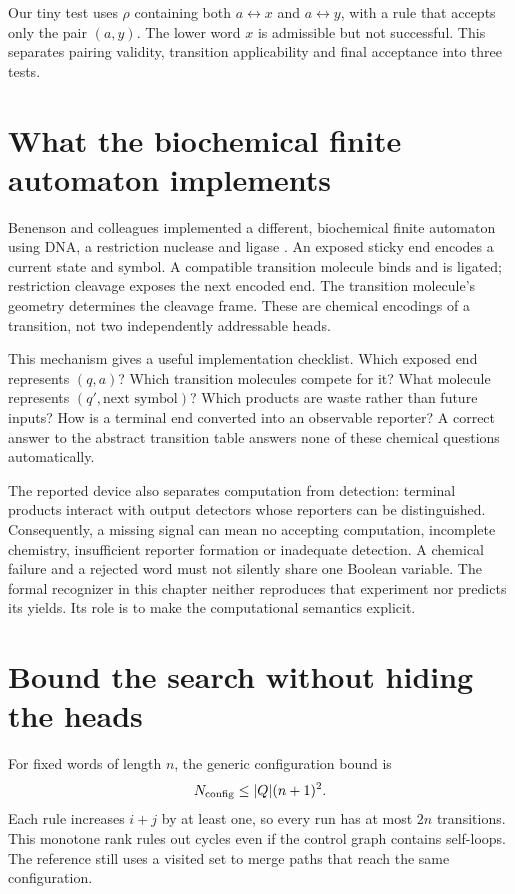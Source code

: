 Our tiny test uses $\rho$ containing both $a\leftrightarrow x$ and
$a\leftrightarrow y$, with a rule that accepts only the pair $(a,y)$.
The lower word $x$ is admissible but not successful. This separates pairing
validity, transition applicability and final acceptance into three tests.

\section{What the biochemical finite automaton implements}
Benenson and colleagues implemented a different, biochemical finite automaton
using DNA, a restriction nuclease and ligase \cite{benenson}. An exposed sticky
end encodes a current state and symbol. A compatible transition molecule binds
and is ligated; restriction cleavage exposes the next encoded end. The
transition molecule's geometry determines the cleavage frame. These are
chemical encodings of a transition, not two independently addressable heads.


This mechanism gives a useful implementation checklist. Which exposed end
represents $(q,a)$? Which transition molecules compete for it? What molecule
represents $(q',\text{next symbol})$? Which products are waste rather than
future inputs? How is a terminal end converted into an observable reporter?
A correct answer to the abstract transition table answers none of these
chemical questions automatically.

The reported device also separates computation from detection: terminal
products interact with output detectors whose reporters can be distinguished.
Consequently, a missing signal can mean no accepting computation, incomplete
chemistry, insufficient reporter formation or inadequate detection. A chemical
failure and a rejected word must not silently share one Boolean variable.
The formal recognizer in this chapter neither reproduces that experiment nor
predicts its yields. Its role is to make the computational semantics explicit.

\section{Bound the search without hiding the heads}
For fixed words of length $n$, the generic configuration bound is
\begin{equation}
 N_{\rm config}\leq |Q|(n+1)^2.
\end{equation}
Each rule increases $i+j$ by at least one, so every run has at most $2n$
transitions. This monotone rank rules out cycles even if the control graph
contains self-loops. The reference still uses a visited set to merge paths
that reach the same configuration.

